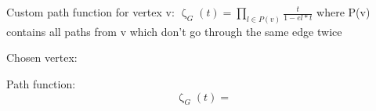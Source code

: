 \documentclass[12pt]{extarticle}
\begin{document}
Custom path function for vertex v: $\upzeta_G(t) = \prod\limits_{l \in P(v)}\frac{t}{1-e{l*t}}$ where P(v) contains all paths from v which don't go through the same edge twice

\bigskip
Chosen vertex:

\bigskip

Path function: $$\upzeta_G(t) = $$
\end{document}
